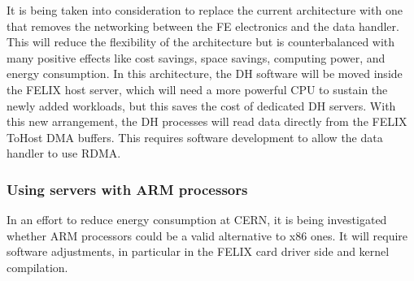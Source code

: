It is being taken into consideration to replace the current architecture with one that removes the networking between the \acs{FE} electronics and the data handler. This will reduce the flexibility of the architecture but is counterbalanced with many positive effects like cost savings, space savings, computing power, and energy consumption. In this architecture, the \acl{DH} software will be moved inside the \acs{FELIX} host server, which will need a more powerful CPU to sustain the newly added workloads, but this saves the cost of dedicated \acs{DH} servers. With this new arrangement, the \acs{DH} processes will read data directly from the \acs{FELIX} ToHost \acs{DMA} buffers. This requires software development to allow the data handler to use \acs{RDMA}.

\subsubsection{Using servers with ARM processors}

In an effort to reduce energy consumption at \acs{CERN}, it is being investigated whether ARM processors could be a valid alternative to x86 ones. It will require software adjustments, in particular in the \acs{FELIX} card driver side and kernel compilation.